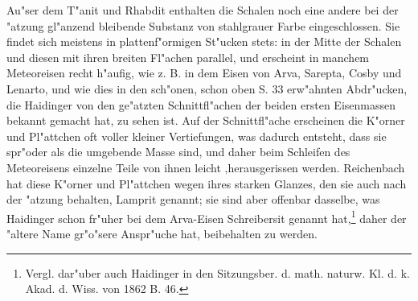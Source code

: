 \documentclass[a4paper, 11pt, oneside]{article}
\begin{document}
Au"ser dem T"anit und Rhabdit enthalten die Schalen noch eine andere bei der "atzung gl"anzend bleibende Substanz von stahlgrauer Farbe eingeschlossen. Sie findet sich meistens in plattenf"ormigen St"ucken stets: in der Mitte der Schalen und diesen mit ihren breiten Fl"achen parallel, und erscheint in manchem Meteoreisen recht h"aufig, wie z. B. in dem Eisen von Arva, Sarepta, Cosby und Lenarto, und wie dies in den sch"onen, schon oben S. 33 erw"ahnten Abdr"ucken, die Haidinger von den ge"atzten Schnittfl"achen der beiden ersten Eisenmassen bekannt gemacht hat, zu sehen ist. Auf der Schnittfl"ache erscheinen die K"orner und Pl"attchen oft voller kleiner Vertiefungen, was dadurch entsteht, dass sie spr"oder als die umgebende Masse sind, und daher beim Schleifen des Meteoreisens einzelne Teile von ihnen leicht ‚herausgerissen werden. Reichenbach hat diese K"orner und Pl"attchen wegen ihres starken Glanzes, den sie auch nach der "atzung behalten, Lamprit genannt; sie sind aber offenbar dasselbe, was Haidinger schon fr"uher bei dem Arva-Eisen Schreibersit genannt hat,\footnote{Vergl. dar"uber auch Haidinger in den Sitzungsber. d. math. naturw. Kl. d. k. Akad. d. Wiss. von 1862 B. 46.} daher der "altere Name gr"o"sere Anspr"uche hat, beibehalten zu werden.
\end{document}
